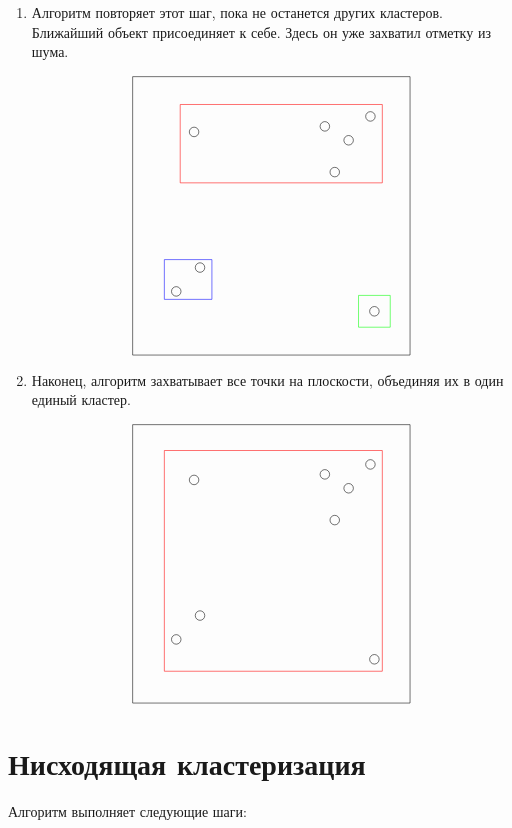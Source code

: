 \documentclass[12pt, a4paper]{article}
\begin{document}
\begin{enumerate}
\item Алгоритм повторяет этот шаг, пока не останется других кластеров. Ближайший объект присоединяет к себе. Здесь он уже захватил отметку из шума.

\[
\begin{tikzpicture}
\draw (-3.5, 3.5) -- (3.5, 3.5);
    \draw (-3.5, -3.5) -- (3.5, -3.5);
    \draw (-3.5, -3.5) -- (-3.5, 3.5);
    \draw (3.5, 3.5) -- (3.5, -3.5);
        
    \draw (2.5, 2.5) circle (0.12);
    \draw (1.35, 2.25) circle (0.12);
    \draw (1.6, 1.1) circle (0.12);
    \draw (1.95, 1.9) circle (0.12);
    \draw (-2.4, -1.9) circle (0.12);
    \draw (-1.8, -1.3) circle (0.12);
    \draw (-1.95, 2.11) circle (0.12);
    \draw (2.6, -2.4) circle (0.12);
        
    \draw[red] (-2.3, 0.83) rectangle (2.8, 2.8);
    \draw[blue] (-2.7, -2.1) rectangle (-1.5, -1.1);
    \draw[green] (2.2, -2.8) rectangle (3, -2);
\end{tikzpicture}
\]

\item Наконец, алгоритм захватывает все точки на плоскости, объединяя их в один единый кластер.

\[
\begin{tikzpicture}
\draw (-3.5, 3.5) -- (3.5, 3.5);
    \draw (-3.5, -3.5) -- (3.5, -3.5);
    \draw (-3.5, -3.5) -- (-3.5, 3.5);
    \draw (3.5, 3.5) -- (3.5, -3.5);
        
    \draw (2.5, 2.5) circle (0.12);
    \draw (1.35, 2.25) circle (0.12);
    \draw (1.6, 1.1) circle (0.12);
    \draw (1.95, 1.9) circle (0.12);
    \draw (-2.4, -1.9) circle (0.12);
    \draw (-1.8, -1.3) circle (0.12);
    \draw (-1.95, 2.11) circle (0.12);
    \draw (2.6, -2.4) circle (0.12);
        
    \draw[red] (-2.7, -2.7) rectangle (2.8, 2.85);
\end{tikzpicture}
\]
\end{enumerate}

\newpage
\section*{Нисходящая кластеризация}
Алгоритм выполняет следующие шаги:
\end{document}
